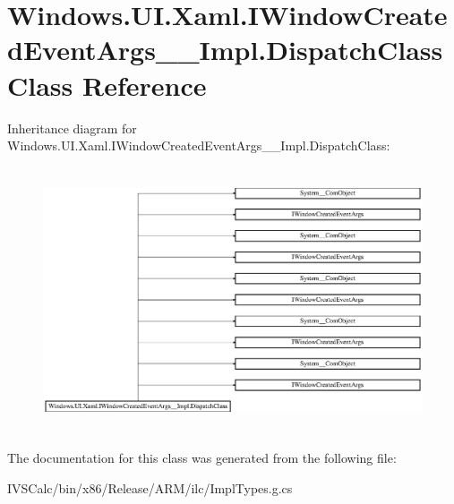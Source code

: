 \hypertarget{class_windows_1_1_u_i_1_1_xaml_1_1_i_window_created_event_args_____impl_1_1_dispatch_class}{}\section{Windows.\+U\+I.\+Xaml.\+I\+Window\+Created\+Event\+Args\+\_\+\+\_\+\+Impl.\+Dispatch\+Class Class Reference}
\label{class_windows_1_1_u_i_1_1_xaml_1_1_i_window_created_event_args_____impl_1_1_dispatch_class}
Inheritance diagram for Windows.\+U\+I.\+Xaml.\+I\+Window\+Created\+Event\+Args\+\_\+\+\_\+\+Impl.\+Dispatch\+Class\+:\begin{figure}[H]
\begin{center}
\leavevmode
\includegraphics[height=7.857142cm]{class_windows_1_1_u_i_1_1_xaml_1_1_i_window_created_event_args_____impl_1_1_dispatch_class}
\end{center}
\end{figure}


The documentation for this class was generated from the following file\+:\begin{DoxyCompactItemize}
\item 
I\+V\+S\+Calc/bin/x86/\+Release/\+A\+R\+M/ilc/Impl\+Types.\+g.\+cs\end{DoxyCompactItemize}
